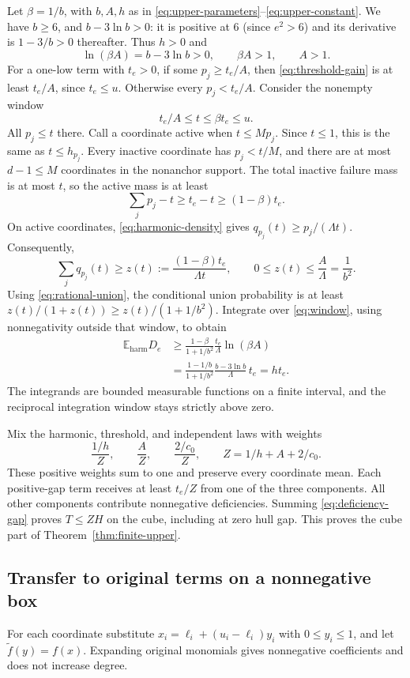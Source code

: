 \documentclass[11pt]{article}
\theoremstyle{remark}
\newcommand{\E}{\mathbb E}
\begin{document}
Let $\beta=1/b$, with $b,A,h$ as in
\eqref{eq:upper-parameters}--\eqref{eq:upper-constant}. We have $b\ge6$,
and $b-3\ln b>0$: it is positive at $6$ (since $e^2>6$) and its
derivative is $1-3/b>0$ thereafter. Thus $h>0$ and
\[
 \ln(\beta A)=b-3\ln b>0,\qquad \beta A>1,\qquad A>1.
\]
For a one-low term with $t_e>0$, if some $p_j\ge t_e/A$, then
\eqref{eq:threshold-gain} is at least $t_e/A$, since $t_e\le u$.
Otherwise every $p_j<t_e/A$. Consider the nonempty window
\begin{equation}\label{eq:window}
 t_e/A\le t\le\beta t_e\le u.
\end{equation}
All $p_j\le t$ there. Call a coordinate active when $t\le Mp_j$.
Since $t\le1$, this is the same as $t\le h_{p_j}$. Every inactive
coordinate has $p_j<t/M$, and there are at most $d-1\le M$ coordinates
in the nonanchor support. The total inactive failure mass is at most
$t$, so the active mass is at least
\[
 \sum_jp_j-t\ge t_e-t\ge(1-\beta)t_e.
\]
On active coordinates, \eqref{eq:harmonic-density} gives
$q_{p_j}(t)\ge p_j/(\Lambda t)$. Consequently,
\[
 \sum_jq_{p_j}(t)\ge z(t):=\frac{(1-\beta)t_e}{\Lambda t},
 \qquad 0\le z(t)\le\frac A\Lambda=\frac1{b^2}.
\]
Using \eqref{eq:rational-union}, the conditional union probability is
at least $z(t)/(1+z(t))\ge z(t)/(1+1/b^2)$. Integrate over
\eqref{eq:window}, using nonnegativity outside that window, to obtain
\begin{align*}
 \E_{\mathrm{harm}}D_e
 &\ge\frac{1-\beta}{1+1/b^2}\frac{t_e}{\Lambda}
              \ln(\beta A)\\
 &=\frac{1-1/b}{1+1/b^2}\frac{b-3\ln b}{\Lambda}\,t_e
   =ht_e.
\end{align*}
The integrands are bounded measurable functions on a finite interval,
and the reciprocal integration window stays strictly above zero.

Mix the harmonic, threshold, and independent laws with weights
\begin{equation}\label{eq:three-mixture}
 \frac{1/h}{Z},\qquad\frac A Z,\qquad\frac{2/c_0}{Z},
 \qquad Z=1/h+A+2/c_0.
\end{equation}
These positive weights sum to one and preserve every coordinate mean.
Each positive-gap term receives at least $t_e/Z$ from one of the three
components. All other components contribute nonnegative deficiencies.
Summing \eqref{eq:deficiency-gap} proves $T\le ZH$ on the cube,
including at zero hull gap. This proves the cube part of
Theorem~\ref{thm:finite-upper}.

\subsection{Transfer to original terms on a nonnegative box}
For each coordinate substitute
$x_i=\ell_i+(u_i-\ell_i)y_i$ with $0\le y_i\le1$, and let
$\widetilde f(y)=f(x)$. Expanding original monomials gives nonnegative
coefficients and does not increase degree.
\end{document}
